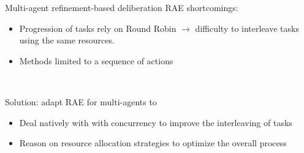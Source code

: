 \begin{frame}{Multi-agent refinement-based deliberation}
    RAE shortcomings:
    \begin{itemize}
        \pause
        \item Progression of tasks rely on Round Robin \pause$\rightarrow$ difficulty to interleave tasks using the same resources.
        \pause
        \item Methods limited to a sequence of actions
    \end{itemize}

    ~~
    
\pause
    Solution: adapt RAE for multi-agents to
    \begin{itemize}
        \pause
        \item Deal natively with with concurrency to improve the interleaving of tasks
        \pause
        \item Reason on resource allocation strategies to optimize the overall process
    \end{itemize}

\end{frame}